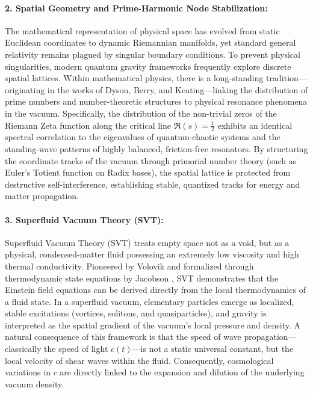 \documentclass[11pt,a4paper]{article}
\theoremstyle{plain}
\theoremstyle{definition}
\theoremstyle{remark}
\begin{document}
\paragraph{2. Spatial Geometry and Prime-Harmonic Node Stabilization:}
The mathematical representation of physical space has evolved from static Euclidean coordinates to dynamic Riemannian manifolds, yet standard general relativity remains plagued by singular boundary conditions. To prevent physical singularities, modern quantum gravity frameworks frequently explore discrete spatial lattices. Within mathematical physics, there is a long-standing tradition—originating in the works of Dyson, Berry, and Keating—linking the distribution of prime numbers and number-theoretic structures to physical resonance phenomena in the vacuum. Specifically, the distribution of the non-trivial zeros of the Riemann Zeta function along the critical line $\mathfrak{R}(s) = \frac{1}{2}$ exhibits an identical spectral correlation to the eigenvalues of quantum-chaotic systems and the standing-wave patterns of highly balanced, friction-free resonators. By structuring the coordinate tracks of the vacuum through primorial number theory (such as Euler's Totient function on Radix bases), the spatial lattice is protected from destructive self-interference, establishing stable, quantized tracks for energy and matter propagation.

\paragraph{3. Superfluid Vacuum Theory (SVT):}
Superfluid Vacuum Theory (SVT) treats empty space not as a void, but as a physical, condensed-matter fluid possessing an extremely low viscosity and high thermal conductivity. Pioneered by Volovik \cite{volovik2003} and formalized through thermodynamic state equations by Jacobson \cite{jacobson1995}, SVT demonstrates that the Einstein field equations can be derived directly from the local thermodynamics of a fluid state. In a superfluid vacuum, elementary particles emerge as localized, stable excitations (vortices, solitons, and quasiparticles), and gravity is interpreted as the spatial gradient of the vacuum's local pressure and density. A natural consequence of this framework is that the speed of wave propagation—classically the speed of light $c(t)$—is not a static universal constant, but the local velocity of shear waves within the fluid. Consequently, cosmological variations in $c$ are directly linked to the expansion and dilution of the underlying vacuum density.
\end{document}
